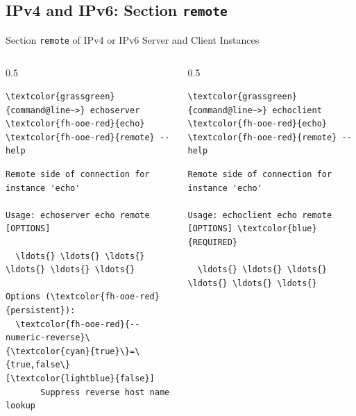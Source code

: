 ﻿\subsection{IPv4 and IPv6: Section \textcolor{fh-ooe-red}{\lstinline|remote|}}

\begin{frame}[fragile]{Section \alert{\lstinline|remote|} of IPv4 or IPv6 Server and Client Instances}
\begin{columns}[T, onlytextwidth]
\begin{column}{0.5\textwidth}
\begin{scriptsize}
\begin{Verbatim}[commandchars=\\\{\}]
\textcolor{grassgreen}{command@line~>} echoserver \textcolor{fh-ooe-red}{echo} \textcolor{fh-ooe-red}{remote} --help
\end{Verbatim}
\begin{Verbatim}[commandchars=\\\{\},frame=leftline,rulecolor=\color{fh-ooe-red}]
Remote side of connection for instance 'echo'

Usage: echoserver echo remote [OPTIONS]

  \ldots{} \ldots{} \ldots{} \ldots{} \ldots{} \ldots{}

Options (\textcolor{fh-ooe-red}{persistent}):
  \textcolor{fh-ooe-red}{--numeric-reverse}\{\textcolor{cyan}{true}\}=\{true,false\} [\textcolor{lightblue}{false}]
       Suppress reverse host name lookup
\end{Verbatim}
\end{scriptsize}
\end{column}
\begin{column}{0.5\textwidth}
\begin{scriptsize}
\begin{Verbatim}[commandchars=\\\{\}]
\textcolor{grassgreen}{command@line~>} echoclient \textcolor{fh-ooe-red}{echo} \textcolor{fh-ooe-red}{remote} --help
\end{Verbatim}
\begin{Verbatim}[commandchars=\\\{\},frame=leftline,rulecolor=\color{fh-ooe-red}]
Remote side of connection for instance 'echo'

Usage: echoclient echo remote [OPTIONS] \textcolor{blue}{REQUIRED}

  \ldots{} \ldots{} \ldots{} \ldots{} \ldots{} \ldots{}


\end{Verbatim}
\end{scriptsize}
\end{column}
\end{columns}
\end{frame}
